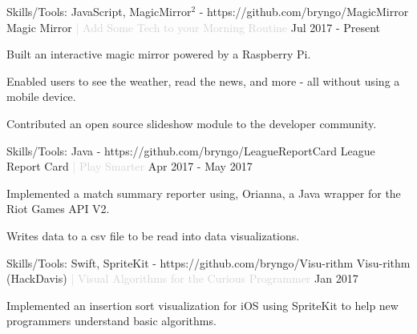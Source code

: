 

\begin{cventries}

  \cventry
  {Skills/Tools: JavaScript, MagicMirror$^2$ - https://github.com/bryngo/MagicMirror} %
  {Magic Mirror \textcolor{lightgray}{| Add Some Tech to your Morning Routine}} %
  {} %
  {Jul 2017 - Present} %
  {
  \begin{cvitems} %
    \item {Built an interactive magic mirror powered by a Raspberry Pi.}
    \item {Enabled users to see the weather, read the news, and more - all without using a mobile device.}
    \item {Contributed an open source slideshow module to the developer community.}
  \end{cvitems}
  }

  \cventry
  {Skills/Tools: Java - https://github.com/bryngo/LeagueReportCard} %
  {League Report Card \textcolor{lightgray}{| Play Smarter}} %
  {} %
  {Apr 2017 - May 2017} %
  {
  \begin{cvitems} %
    \item {Implemented a match summary reporter using, Orianna, a Java wrapper for the Riot Games API V2.}
    \item {Writes data to a csv file to be read into data visualizations.}
  \end{cvitems}
  }

  \cventry
  {Skills/Tools: Swift, SpriteKit - https://github.com/bryngo/Visu-rithm} %
  {Visu-rithm (HackDavis) \textcolor{lightgray}{| Visual Algorithms for the Curious Programmer}} %
  {} %
  {Jan 2017} %
  {
  \begin{cvitems} %
    \item {Implemented an insertion sort visualization for iOS using SpriteKit to help new programmers understand basic algorithms.}
  \end{cvitems}
  }


\end{cventries}

